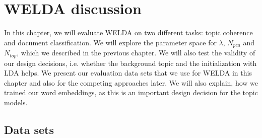\documentclass[
        a4paper,
        titlepage,
        twoside,
        parskip
        ]{scrbook}
\theoremstyle{break}
\begin{document}
\chapter{WELDA discussion}
\label{sec:welda_discussion}

In this chapter, we will evaluate WELDA on two different tasks: topic coherence and document classification.
We will explore the parameter space for $\lambda$, $N_{pca}$ and $N_{top}$, which we described in the previous chapter.
We will also test the validity of our design decisions, i.e. whether the background topic and the initialization with LDA helps.
We present our evaluation data sets that we use for WELDA in this chapter and also for the competing approaches later.
We will also explain, how we trained our word embeddings, as this is an important design decision for the topic models.

\section{Data sets}
\label{sec:data_sets}
\end{document}
